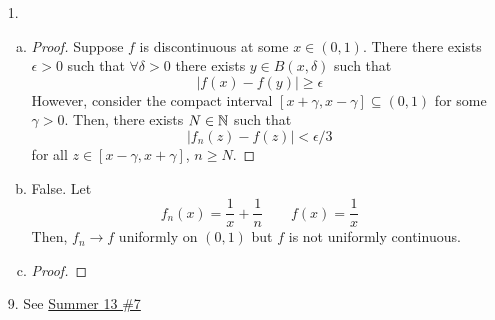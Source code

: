 \begin{itemize}
\item[1.] 
	\begin{enumerate}[(a)]
	\item \begin{proof}
		Suppose $f$ is discontinuous at some $x \in (0,1)$. There there exists $\epsilon >0$ such that $\forall \delta>0$ there exists $y \in B(x,\delta)$ such that
			\[ |f(x)-f(y)| \ge \epsilon \]
		However, consider the compact interval $[x+\gamma,x-\gamma] \subseteq (0,1)$ for some $\gamma >0$. Then, there exists $N \in \mathbb{N}$ such that
			\[ |f_n(z)-f(z)| < \epsilon /3 \]
		for all $z \in [x-\gamma,x+\gamma]$, $n \ge N$.
	\end{proof}

	\item False. Let
		\[ f_n(x) = \dfrac 1x + \dfrac 1n \quad \quad f(x) = \dfrac 1x \]
	Then, $f_n \to f$ uniformly on $(0,1)$ but $f$ is not uniformly continuous.
		
	\item \begin{proof}
		
	\end{proof}

	\end{enumerate}


\item[9.] See \hyperref[q:s13-7]{Summer 13 \#7}

\end{itemize}